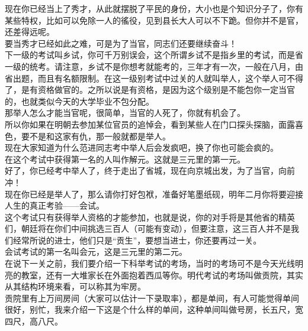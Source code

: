 \begin{multicols}{\theparacolNo}
现在你已经当上了秀才，从此就摆脱了平民的身份，大小也是个知识分子了，你有某些特权，比如可以免除一人的徭役，见到县长大人可以不下跪。但你并不是官，还差得远呢。\\

要当秀才已经如此之难，可是为了当官，同志们还要继续奋斗！\\

下一级的考试叫乡试，你可千万别误会，这个所谓乡试不是指乡里的考试，而是省一级的统考。请注意，乡试不是你想考就能考的，三年才有一次，一般在八月，由省出题，而且有名额限制。在这一级别考试中过关的人就叫举人，这个举人可不得了，是有资格做官的。之所以说是有资格，是因为这个级别是不能包你一定当官的，也就类似今天的大学毕业不包分配。\\

那举人怎么才能当官呢，很简单，当官的人死了，你就有机会了。\\

所以你如果在明朝去参加某位官员的追悼会，看到某些人在门口探头探脑，面露喜色，要不是和这家有仇，那一般就都是举人。\\

现在大家知道为什么范进同志考中举人后会发疯吧，换了你也可能会疯的。\\

在这个考试中获得第一名的人叫作解元。这就是三元里的第一元。\\

好了，你已经考中举人了，终于走出了省城，现在向京城出发，为了当官，向前冲！\\

现在你已经是举人了，那么请你打好包袱，准备好笔墨纸砚，明年二月你将要迎接人生的真正考验——会试。\\

这个考试只有获得举人资格的才能参加，也就是说，你的对手将是其他省的精英们，朝廷将在你们中间挑选三百人（可能有变动），但要注意，这三百人并不是我们经常所说的进士，他们只是“贡生”，要想当进士，你还要再过一关。\\

会试考试的第一名叫会元，这是三元里的第二元。\\

在说下一关之前，我们要介绍一下科举考试的考场，当时的考场可不是今天光线明亮的教室，还有一大堆家长在外面抱着西瓜等你。明代考试的考场叫做贡院，其实从其结构环境来看，可以称其为牢房。\\

贡院里有上万间房间（大家可以估计一下录取率），都是单间，有人可能觉得单间很好，别忙，我来介绍一下这是个什么样的单间，这种单间叫做号房，长五尺，宽四尺，高八尺。\\


\end{multicols}
